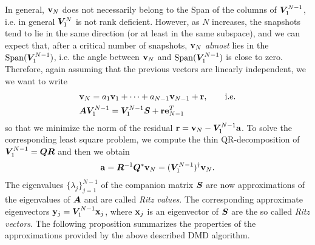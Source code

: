 In general, $\vb{v}_N$ does not necessarily belong to the Span of the columns of $\vb*{V}_1^{N-1}$, i.e. in general $\vb*{V}_1^{N}$ is not rank deficient. However, as $N$ increases, the snapshots tend to lie in the same direction (or at least in the same subspace), and we can expect that, after a critical number of snapshots, $\vb{v}_N$ \emph{almost} lies in the $\mathrm{Span}{(\vb*{V}_1^{N-1})}$, i.e. the angle between $\vb{v}_N$ and $\mathrm{Span}{(\vb*{V}_1^{N-1})}$ is close to zero. Therefore, again assuming that the previous vectors are linearly independent, we we want to write
\begin{equation}
    \label{vn_error}
    \begin{split}
        & \vb{v}_N = a_1 \vb{v}_1 + \dots + a_{N-1} \vb{v}_{N-1} + \vb{r}, \qquad \text{i.e.}\\
        & \vb*{A}\vb*{V}_1^{N-1}  = \vb*{V}_1^{N-1}\vb*{S} + \vb{r}\vb{e}_{N-1}^T
    \end{split}
\end{equation}
so that we minimize the norm of the residual $\vb{r} = \vb{v}_N - \vb*{V}_1^{N-1}\vb{a}$. To solve the corresponding least square problem, we compute the thin QR-decomposition of $\vb*{V}_1^{N-1} = \vb*{Q}\vb*{R}$ and then we obtain
\begin{equation}
    \label{a_qrleastsquare}
    \vb{a} = \vb*{R}^{-1} \vb*{Q}^*\vb{v}_N = (\vb*{V}_1^{N-1})^{\dagger}\vb{v}_N.
\end{equation}
The eigenvalues $\{\lambda_j\}_{j = 1}^{N-1}$ of the companion matrix $\vb*{S}$ are now approximations of the eigenvalues of $\vb*{A}$ and are called \emph{Ritz values}. The corresponding approximate eigenvectors $\vb{y}_j = \vb*{V}_1^{N-1}\vb{x}_j$, where $\vb{x}_j$ is an eigenvector of $\vb*{S}$ are the so called \emph{Ritz vectors}. The following proposition summarizes the properties of the approximations provided by the above described DMD algorithm.


